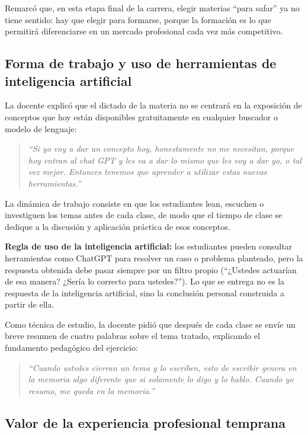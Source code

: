 \documentclass[12pt,oneside]{book}
\begin{document}
Remarcó que, en esta etapa final de la carrera, elegir materias ``para safar'' ya no tiene sentido: hay que elegir para formarse, porque la formación es lo que permitirá diferenciarse en un mercado profesional cada vez más competitivo.

\subsection{Forma de trabajo y uso de herramientas de inteligencia artificial}

La docente explicó que el dictado de la materia no se centrará en la exposición de conceptos que hoy están disponibles gratuitamente en cualquier buscador o modelo de lenguaje:

\begin{quote}
\textit{``Si yo voy a dar un concepto hoy, honestamente no me necesitan, porque hoy entran al chat GPT y les va a dar lo mismo que les voy a dar yo, o tal vez mejor. Entonces tenemos que aprender a utilizar estas nuevas herramientas.''}
\end{quote}

La dinámica de trabajo consiste en que los estudiantes lean, escuchen o investiguen los temas antes de cada clase, de modo que el tiempo de clase se dedique a la discusión y aplicación práctica de esos conceptos.

\begin{important}[]
\textbf{Regla de uso de la inteligencia artificial:} los estudiantes pueden consultar herramientas como ChatGPT para resolver un caso o problema planteado, pero la respuesta obtenida debe pasar siempre por un filtro propio (``¿Ustedes actuarían de esa manera? ¿Sería lo correcto para ustedes?''). Lo que se entrega no es la respuesta de la inteligencia artificial, sino la conclusión personal construida a partir de ella.
\end{important}

Como técnica de estudio, la docente pidió que después de cada clase se envíe un breve resumen de cuatro palabras sobre el tema tratado, explicando el fundamento pedagógico del ejercicio:

\begin{quote}
\textit{``Cuando ustedes cierran un tema y lo escriben, esto de escribir genera en la memoria algo diferente que si solamente lo digo y lo hablo. Cuando yo resumo, me queda en la memoria.''}
\end{quote}

\subsection{Valor de la experiencia profesional temprana}
\end{document}
